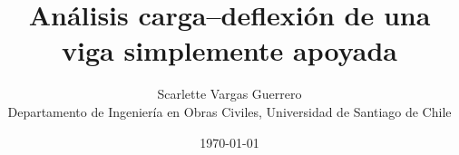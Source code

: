 \documentclass[10pt,letterpaper]{article}
\title{Análisis carga--deflexión de una viga simplemente apoyada}
\author{Scarlette Vargas Guerrero\\
        {\footnotesize Departamento de Ingeniería en Obras Civiles, Universidad de Santiago de Chile}
}
\date{\today}
\begin{document}
\maketitle



\renewcommand*{\bibfont}{\footnotesize}
\printbibliography%
\end{document}
